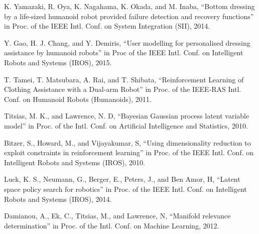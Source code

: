 \documentclass[a4paper]{article}
\begin{document}
\small{
\begin{thebibliography}{15}
K. Yamazaki, R. Oya, K. Nagahama, K. Okada, and M. Inaba, ``Bottom dressing by a life-sized humanoid robot provided failure detection and recovery functions'' in Proc. of the IEEE Intl. Conf. on System Integration (SII), 2014.

Y. Gao, H. J. Chang, and Y. Demiris, ``User modelling for personalised dressing assistance by humanoid robots'' in Proc of the IEEE Intl. Conf. on Intelligent Robots and Systems (IROS), 2015.

T. Tamei, T. Matsubara, A. Rai, and T. Shibata, ``Reinforcement Learning of Clothing Assistance with a Dual-arm Robot'' in Proc. of the IEEE-RAS Intl. Conf. on Humanoid Robots (Humanoids), 2011.

Titsias, M. K., and Lawrence, N. D, ``Bayesian Gaussian process latent variable model'' in Proc. of the Intl. Conf. on Artificial Intelligence and Statistics, 2010.

Bitzer, S., Howard, M., and Vijayakumar, S, ``Using dimensionality reduction to exploit constraints in reinforcement learning'' in Proc. of the IEEE Intl. Conf. on Intelligent Robots and Systems (IROS), 2010.

Luck, K. S., Neumann, G., Berger, E., Peters, J., and Ben Amor, H, ``Latent space policy search for robotics'' in Proc. of the IEEE Intl. Conf. on Intelligent Robots and Systems (IROS), 2014.

Damianou, A., Ek, C., Titsias, M., and Lawrence, N, ``Manifold relevance determination'' in Proc. of the Intl. Conf. on Machine Learning, 2012.

\end{thebibliography}
}
\normalsize
\end{document}
